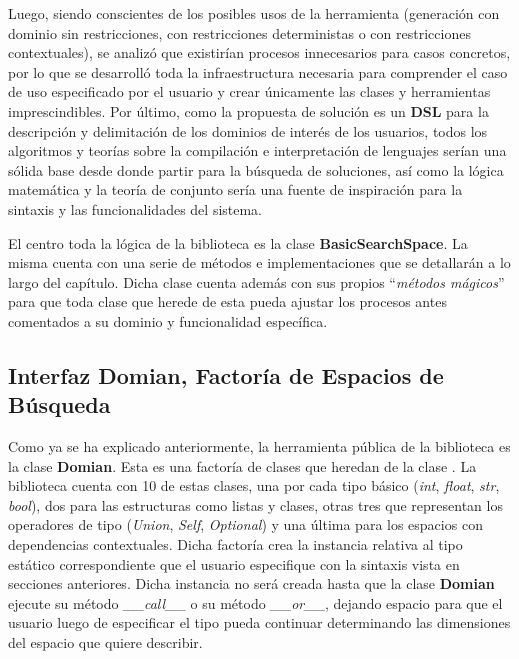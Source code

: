 Luego, siendo conscientes de los posibles usos de la herramienta (generación con dominio sin restricciones, con
restricciones deterministas o con restricciones contextuales), se analizó que existirían procesos innecesarios
para casos concretos, por lo que se desarrolló toda la infraestructura necesaria para comprender el caso de uso
especificado por el usuario y crear únicamente las clases y herramientas imprescindibles. Por último, como la
propuesta de solución es un {\bf DSL} para la descripción y delimitación de los dominios de interés de los usuarios,
todos los algoritmos y teorías sobre la compilación e interpretación de lenguajes serían una sólida base desde
donde partir para la búsqueda de soluciones, así como la lógica matemática y la teoría de conjunto sería una
fuente de inspiración para la sintaxis y las funcionalidades del sistema.

El centro toda la lógica de la biblioteca es la clase {\bf BasicSearchSpace}. La misma cuenta con una
serie de métodos e implementaciones que se detallarán a lo largo del capítulo. Dicha clase cuenta además con
sus propios ``{\it métodos mágicos}'' para que toda clase que herede de esta pueda ajustar los procesos antes comentados
a su dominio y funcionalidad específica.


\subsection{Interfaz Domian, Factoría de Espacios de Búsqueda}

Como ya se ha explicado anteriormente, la herramienta pública de la biblioteca es la clase {\bf Domian}. Esta es una
factoría de clases que heredan de la clase . La biblioteca cuenta con 10 de estas clases, una
por cada tipo básico ({\it int}, {\it float}, {\it str}, {\it bool}), dos para las estructuras como listas y clases,
otras tres que representan los operadores de tipo ({\it Union}, {\it Self}, {\it Optional}) y una última para los
espacios con dependencias contextuales. Dicha factoría crea la instancia relativa al tipo estático correspondiente que el usuario
especifique con la sintaxis vista en secciones anteriores. Dicha instancia no será creada hasta que la clase
    {\bf Domian} ejecute su método {\it \_\_call\_\_} o su método {\it \_\_or\_\_}, dejando espacio para que el usuario
luego de especificar el tipo pueda continuar determinando las dimensiones del espacio que quiere describir.
\newline

